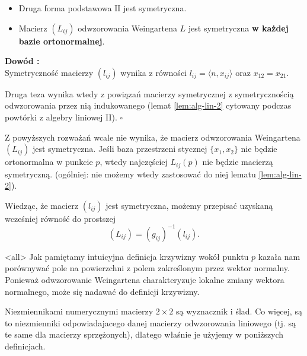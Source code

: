 \begin{frame}

\begin{lemat}
\begin{itemize}
\pause \item Druga forma podstawowa $\text{II}$ jest symetryczna.
\pause \item Macierz $(L_{ij})$ odwzorowania Weingartena $L$ jest symetryczna \textbf{w każdej bazie ortonormalnej}.
\end{itemize}
\end{lemat}
\textcolor{ared}{\textbf{Dowód :}}\\\pause 
Symetryczność macierzy $(l_{ij})$ wynika z równości $l_{ij} =\langle n,x_{ij} \rangle$ oraz $x_{12}=x_{21}$. 

\pause Druga teza wynika wtedy z powiązań macierzy symetrycznej z 
symetrycznością odwzorowania przez nią indukowanego (lemat \ref{lem:alg-lin-2} 
cytowany podczas powtórki z algebry liniowej II).
\hfill $\square$

\end{frame}
\begin{frame}[<+->]

\begin{uwaga}
Z powyższych rozważań wcale nie wynika, że macierz odwzorowania Weingartena $(L_{ij})$ jest symetryczna. Jeśli baza przestrzeni stycznej $\{x_1, x_2\}$ nie będzie ortonormalna w punkcie $p$, wtedy najczęściej $L_{ij}(p)$ nie będzie macierzą symetryczną. (ogólniej: nie możemy wtedy zastosować do niej lematu \ref{lem:alg-lin-2}).
\end{uwaga}

\begin{uwaga}
Wiedząc, że macierz $(l_{ij})$ jest symetryczna, możemy przepisać uzyskaną wcześniej równość do prostszej 
\[(L_{ij})=(g_{ij})^{-1}(l_{ij}).\]
\end{uwaga}

\end{frame}
\mode<all>{}
Jak pamiętamy intuicyjna definicja krzywizny wokół punktu $p$ kazała nam porównywać pole na powierzchni z polem zakreślonym przez wektor normalny. Ponieważ odwzorowanie Weingartena charakteryzuje lokalne zmiany wektora normalnego, może się nadawać do definicji krzywizny.

Niezmiennikami numerycznymi macierzy $2\times2$ są wyznacznik i ślad. Co więcej, są to niezmienniki odpowiadajacego danej macierzy odwzorowania liniowego (tj. są te same dla macierzy sprzężonych), dlatego właśnie je użyjemy w poniższych definicjach.


